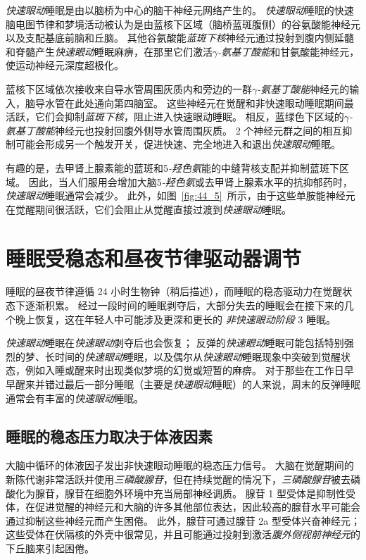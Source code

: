 \textit{快速眼动}睡眠是由以脑桥为中心的脑干神经元网络产生的。
\textit{快速眼动}睡眠的快速脑电图节律和梦境活动被认为是由蓝核下区域（脑桥蓝斑腹侧）的谷氨酸能神经元以及支配基底前脑和丘脑。
其他谷氨酸能\textit{蓝斑下核}神经元通过投射到腹内侧延髓和脊髓产生\textit{快速眼动}睡眠麻痹，在那里它们激活\textit{$\gamma$-氨基丁酸能}和甘氨酸能神经元，使运动神经元深度超极化。


蓝核下区域依次接收来自导水管周围灰质内和旁边的一群\textit{$\gamma$-氨基丁酸能}神经元的输入，脑导水管在此处通向第四脑室。
这些神经元在觉醒和非快速眼动睡眠期间最活跃，它们会抑制\textit{蓝斑下核}，阻止进入快速眼动睡眠。
相反，蓝绿色下区域的\textit{$\gamma$-氨基丁酸能}神经元也投射回腹外侧导水管周围灰质。
2 个神经元群之间的相互抑制可能会形成另一个触发开关，促进快速、完全地进入和退出\textit{快速眼动}睡眠。


有趣的是，去甲肾上腺素能的蓝斑和5\textit{-羟色氨}能的中缝背核支配并抑制蓝斑下区域。
因此，当人们服用会增加大脑5\textit{-羟色氨}或去甲肾上腺素水平的抗抑郁药时，\textit{快速眼动}睡眠通常会减少。
此外，如图~\ref{fig:44_5}~所示，由于这些单胺能神经元在觉醒期间很活跃，它们会阻止从觉醒直接过渡到\textit{快速眼动}睡眠。



\section{睡眠受稳态和昼夜节律驱动器调节}

睡眠的昼夜节律遵循 24 小时生物钟（稍后描述），而睡眠的稳态驱动力在觉醒状态下逐渐积累。
经过一段时间的睡眠剥夺后，大部分失去的睡眠会在接下来的几个晚上恢复，这在年轻人中可能涉及更深和更长的 \textit{非快速眼动阶段} 3 睡眠。


\textit{快速眼动}睡眠在\textit{快速眼动}剥夺后也会恢复；
反弹的\textit{快速眼动}睡眠可能包括特别强烈的梦、长时间的\textit{快速眼动}睡眠，以及偶尔从\textit{快速眼动}睡眠现象中突破到觉醒状态，例如入睡或醒来时出现类似梦境的幻觉或短暂的麻痹。
对于那些在工作日早早醒来并错过最后一部分睡眠（主要是\textit{快速眼动}睡眠）的人来说，周末的反弹睡眠通常会有丰富的\textit{快速眼动}睡眠。



\subsection{睡眠的稳态压力取决于体液因素}

大脑中循环的体液因子发出非快速眼动睡眠的稳态压力信号。
大脑在觉醒期间的新陈代谢非常活跃并使用\textit{三磷酸腺苷}，但在持续觉醒的情况下，\textit{三磷酸腺苷}被去磷酸化为腺苷，腺苷在细胞外环境中充当局部神经调质。
腺苷 1 型受体是抑制性受体，在促进觉醒的神经元和大脑的许多其他部位表达，因此较高的腺苷水平可能会通过抑制这些神经元而产生困倦。
此外，腺苷可通过腺苷 2a 型受体兴奋神经元；
这些受体在伏隔核的外壳中很常见，并且可能通过投射到激活\textit{腹外侧视前神经元}的下丘脑来引起困倦。


